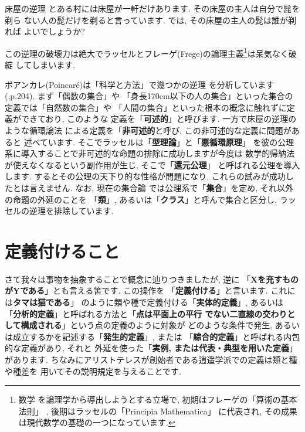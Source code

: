 \begin{itembox}[c]{{床屋の逆理}}
\quad とある村には床屋が一軒だけあります. その床屋の主人は自分で髭を剃ら
ない人の髭だけを剃ると言っています. では, その床屋の主人の髭は誰が剃れば
よいでしょうか?
\end{itembox}


この逆理の破壊力は絶大でラッセルとフレーゲ(Frege)の論理主義\footnote{数学
を論理学から導出しようとする立場で, 初期はフレーゲの「算術の基本法則」
\cite{フレーゲ}, 後期はラッセルの「Principia Mathematica」\cite{Russell}
に代表され, その成果は現代数学の基礎の一つになっています.}は呆気なく破綻
してしまいます.
\newline


ポアンカレ(Poincar\'e)は「科学と方法」\cite{ポアンカレ}で幾つかの逆理
を分析しています(\cite{ポアンカレ},p.204). まず「偶数の集合」や
「身長170cm以下の人の集合」といった集合の定義では「自然数の集合」や
「人間の集合」といった根本の概念に触れずに定義ができており, このような
定義を「\textbf{可述的}」と呼びます. 一方で床屋の逆理のような循環論法
による定義を「\textbf{非可述的}と呼び, この非可述的な定義に問題があると
述べています. そこでラッセルは「\textbf{型理論}」と「\textbf{悪循環原理}」
を彼の公理系に導入することで非可述的な命題の排除に成功しますが今度は
数学的帰納法が使えなくなるという副作用が生じ,  そこで「\textbf{還元公理}」
と呼ばれる公理を導入します.  するとその公理の天下り的な性格が問題になり,
 これらの試みが成功したとは言えません\cite{Russell}. なお, 現在の集合論
では公理系で「\textbf{集合}」を定め, それ以外の命題の外延のことを
「\textbf{類}」, あるいは「\textbf{クラス}」と呼んで集合と区分し,
 ラッセルの逆理を排除しています.

\section{定義付けること}

さて我々は事物を抽象することで概念に辿りつきましたが, 逆に
「\textbf{Xを充すものがYである}」とも言える筈です. この操作を
「\textbf{定義付ける}」と言います. これには\textbf{タマは猫である}」
のように類や種で定義付ける「\textbf{実体的定義}」, あるいは
「\textbf{分析的定義}」と呼ばれる方法と「\textbf{点は平面上の平行
でない二直線の交わりとして構成される}」という点の定義のように対象が
どのような条件で発生, あるいは成立するかを記述する「\textbf{発生的定義}」,
 または 「\textbf{綜合的定義}」と呼ばれる内包的な定義があり, それと
外延を使った「\textbf{実例, または代表・典型を用いた定義}」があります.
 ちなみにアリストテレスが創始者である逍遥学派での定義は類と種や種差を
用いてその説明規定を与えることです.


